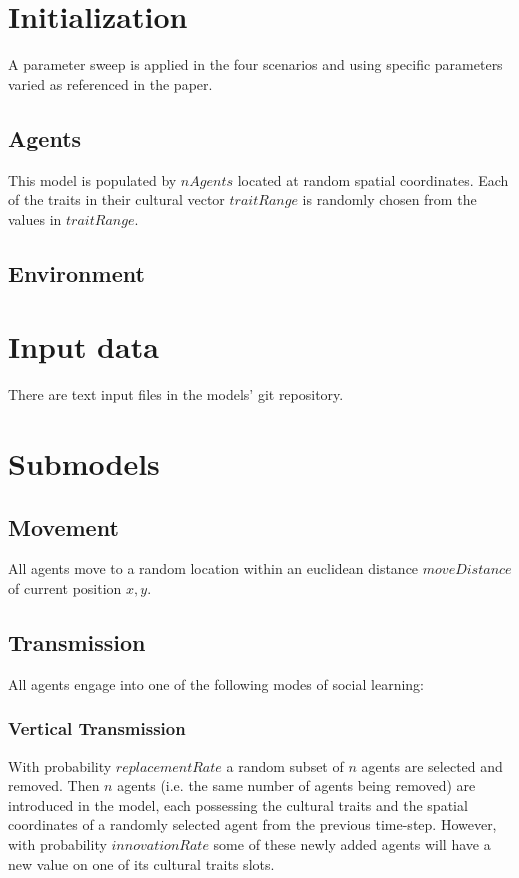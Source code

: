 \documentclass[11pt,a4paper,twocolumn,notitlepage]{article}
\begin{document}
\section{Initialization}

A parameter sweep is applied in the four scenarios and using specific parameters varied as referenced in the paper.

\subsection{Agents}

This model is populated by $nAgents$ located at random spatial coordinates. Each of the traits in their cultural vector $traitRange$ is randomly chosen from the values in $traitRange$.

\subsection{Environment}

\section{Input data}

There are text input files in the models' git repository. 

\section{Submodels}

\subsection{Movement}

All agents move to a random location within an euclidean distance $moveDistance$ of current position $x,y$.

\subsection{Transmission}
All agents engage into one of the following modes of social learning:

\subsubsection{Vertical Transmission}

With probability $replacementRate$ a random subset of $n$ agents are selected and removed. Then $n$ agents (i.e. the same number of agents being removed) are introduced in the model, each possessing the cultural traits and the spatial coordinates of a randomly selected agent from the previous time-step. However, with probability $innovationRate$ some of these newly added agents will have a new value on one of its cultural traits slots.
\end{document}

